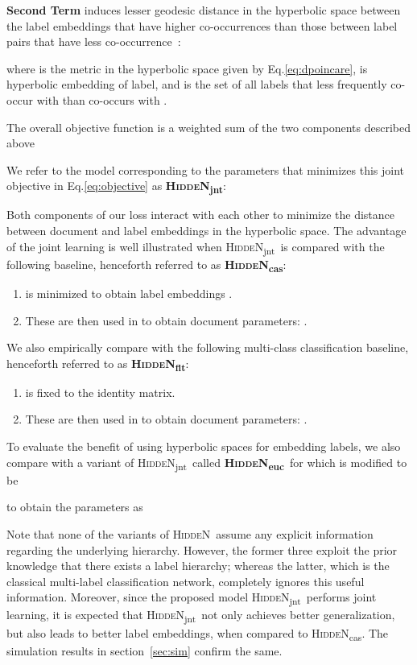 \documentclass[11pt,a4paper]{article}
\newcommand{\model}{\mbox{\textsc{HiddeN}}}
\newcommand{\modeljnt}{\mbox{\textsc{HiddeN}\textsubscript{jnt}}}
\newcommand{\modelcas}{\mbox{\textsc{HiddeN}\textsubscript{cas}}}
\newcommand{\modelflt}{\mbox{\textsc{HiddeN}\textsubscript{flt}}}
\newcommand{\modeleuc}{\mbox{\textsc{HiddeN}\textsubscript{euc}}}
\begin{document}
\textbf{Second Term} induces lesser geodesic distance in the hyperbolic space between the label embeddings that have higher co-occurrences than those between label pairs that have less co-occurrence~\cite{lorentz}:

where  is the metric in the hyperbolic space given by Eq.\ref{eq:dpoincare},  is hyperbolic embedding of  label, and  is the set of all labels that less frequently co-occur with  than  co-occurs with .

The overall objective function is a weighted sum of the two components described above


We refer to the model corresponding to the parameters  that minimizes this joint objective in Eq.\ref{eq:objective} as \textbf{\modeljnt}:


Both components of our loss interact with each other to minimize the distance between document and label embeddings in the hyperbolic space. The advantage of the joint learning is well illustrated when \modeljnt\ is compared with the following baseline, henceforth referred to as \textbf{\modelcas}:
\begin{enumerate}[label=(\arabic*),topsep=0pt,itemsep=-1ex,partopsep=1ex,parsep=1ex,leftmargin=*]
    \item  is minimized to obtain label embeddings .
    \item These are then used in  to obtain document parameters: .
\end{enumerate}

We also empirically compare with the following multi-class classification baseline, henceforth referred to as \textbf{\modelflt}:
\begin{enumerate}[label=(\arabic*),topsep=0pt,itemsep=-1ex,partopsep=1ex,parsep=1ex,leftmargin=*]
    \item  is fixed to the identity matrix.
    \item These are then used in  to obtain document parameters: . 
\end{enumerate}

To evaluate the benefit of using hyperbolic spaces for embedding labels, we also compare with a variant of \modeljnt\ called \textbf{\modeleuc}\ for which  is modified to be

to obtain the parameters  as 

Note that none of the variants of \model\ assume any explicit information regarding the underlying hierarchy. However, the former three exploit the prior knowledge that there exists a label hierarchy; whereas the latter, which is the classical multi-label classification network, completely ignores this useful information. Moreover, since the proposed model \modeljnt\ performs joint learning, it is expected that \modeljnt\ not only achieves better generalization, but also leads to better label embeddings, when compared to \modelcas. The simulation results in section~\ref{sec:sim} confirm the same.
\end{document}
